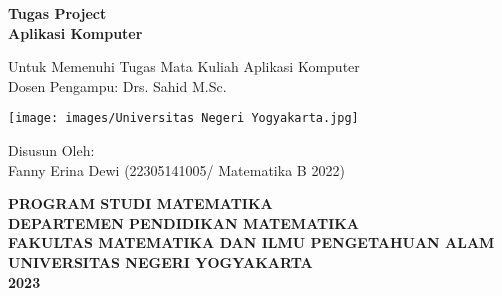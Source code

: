 \documentclass[12pt,arial,letterpaper]{book}
\begin{document}
\clearpage
\thispagestyle{empty}
\frontmatter
\begin{center}
    \huge{\textbf{Tugas Project \\ Aplikasi Komputer}}
\end{center}
\begin{center}
    \large{Untuk Memenuhi Tugas Mata Kuliah Aplikasi Komputer \\ Dosen Pengampu: Drs. Sahid M.Sc.}
\end{center}
\vspace{2cm}
\begin{minipage}{17cm}
    \begin{center}
        \texttt{[image: images/Universitas Negeri Yogyakarta.jpg]}
    \end{center}
\end{minipage}

\vspace{3cm}

\begin{center}
    \large{Disusun Oleh: \\ Fanny Erina Dewi (22305141005/ Matematika B 2022)}
\end{center}

\vspace{4cm}
\begin{center}
    \large{\textbf{PROGRAM STUDI MATEMATIKA}} \\
    \large{\textbf{DEPARTEMEN PENDIDIKAN MATEMATIKA}} \\
    \large{\textbf{FAKULTAS MATEMATIKA DAN ILMU PENGETAHUAN ALAM}} \\
    \large{\textbf{UNIVERSITAS NEGERI YOGYAKARTA}} \\
    \large{\textbf{2023}}
\end{center}

\clearpage
\thispagestyle{empty}
\tableofcontents
\mainmatter
\end{document}
